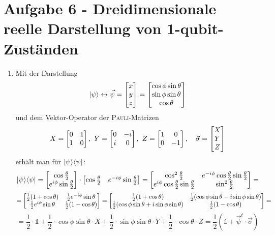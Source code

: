 \section*{Aufgabe 6 - Dreidimensionale reelle Darstellung von 1-qubit-Zuständen}
\begin{enumerate}
\item Mit der Darstellung \[ | \psi \rangle \leftrightarrow \vec\psi =
        \begin{bmatrix}x\\y\\z\end{bmatrix} =
        \begin{bmatrix}\cos\phi \sin\theta \\
                      \sin\phi \sin\theta \\
                      \cos \theta
        \end{bmatrix} \]
      und dem Vektor-Operator der \textsc{Pauli}-Matrizen 
        \[ X = \begin{bmatrix}0&1\\1&0\end{bmatrix},\ Y = \begin{bmatrix}0&-i\\i&0\end{bmatrix},\ Z = \begin{bmatrix}1&0\\0&-1\end{bmatrix},\quad \vec\sigma = \begin{bmatrix}X\\Y\\Z\end{bmatrix} \]
      erhält man für $| \psi \rangle\langle \psi |$:
        \[ | \psi \rangle\langle \psi | =
        \begin{bmatrix}\cos\frac{\theta}{2}\\e^{i\phi}\sin\frac{\theta}{2}\end{bmatrix}\cdot
        \begin{bmatrix}{\cos\frac{\theta}{2}} &
        {e^{-i\phi}\sin\frac{\theta}{2}}\end{bmatrix} =
        \begin{bmatrix} \cos^2\frac{\theta }{2} & e^{-i \phi } \cos\frac{\theta }{2}
        \sin\frac{\theta }{2}\\ e^{i \phi } \cos\frac{\theta }{2} \sin\frac{\theta }{2}
        & \sin^2\frac{\theta }{2}\end{bmatrix} = \]
        \[ = \begin{bmatrix}\frac{1}{2}(1+\cos\theta) & \frac{1}{2} e^{-i \phi }
        \sin\theta\\ \frac{1}{2}e^{i\phi}\sin\theta & \frac{1}{2}(1-\cos\theta) \end{bmatrix} = 
        \begin{bmatrix}\frac{1}{2}(1+\cos\theta) & \frac{1}{2}(\cos\phi
        \sin\theta - i\sin\phi\sin\theta)\\ \frac{1}{2}(\cos\phi\sin\theta +
        i\sin\phi\sin\theta) & \frac{1}{2}(1-\cos\theta) \end{bmatrix} = \]
        \[ = \frac{1}{2}\cdot \mathds{1} + \frac{1}{2}\cdot \cos\phi\sin\theta\cdot X + \frac{1}{2}\cdot \sin\phi\sin\theta\cdot Y + \frac{1}{2}\cdot \cos\theta\cdot Z =
        \frac{1}{2}(\mathds{1} +
        \vec\psi^t \cdot\vec\sigma) \]
\end{enumerate}
